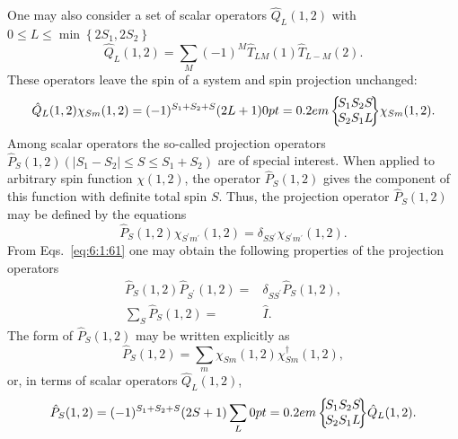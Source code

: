 One may also consider a set of scalar operators $\widehat{Q}_{L}(1,2)$ with $0 \leq L \leq \min \left\{2 S_{1}, 2 S_{2}\right\}$
\begin{equation}
\widehat{Q}_{L}(1,2)=\sum_{M}(-1)^{M} \widehat{T}_{L M}(1) \hat{T}_{L-M}(2). \label{eq:6:1:59}
\end{equation}
These operators leave the spin of a system and spin projection unchanged:
\begin{equation}
\hat{Q}_{L}(1,2) \chi_{S m}(1,2)=(-1)^{S_{1}+S_{2}+S}(2 L+1)\sixj{S_{1}}{S_{2}}{S}{S_{2}}{S_{1}}{L} \chi_{S m}(1,2). \label{eq:6:1:60}
\end{equation}
Among scalar operators the so-called projection operators $\widehat{P}_{S}(1,2)\left(\left|S_{1}-S_{2}\right| \leq S \leq S_{1}+S_{2}\right)$ are of special interest. When applied to arbitrary spin function $\chi(1,2)$, the operator $\widehat{P}_{S}(1,2)$ gives the component of this function with definite total spin $S$. Thus, the projection operator $\widehat{P}_{S}(1,2)$ may be defined by the equations
\begin{equation}
\widehat{P}_{S}(1,2) \chi_{S^{\prime} m^{\prime}}(1,2)=\delta_{S S^{\prime}} \chi_{S^{\prime} m^{\prime}}(1,2). \label{eq:6:1:61}
\end{equation}
From Eqs.~\eqref{eq:6:1:61} one may obtain the following properties of the projection operators
\begin{align}
\hat{P}_{S}(1,2) \hat{P}_{S^{\prime}}(1,2)=&\delta_{S S^{\prime}} \hat{P}_{S}(1,2), \label{eq:6:1:62}\\
\sum_{S} \hat{P}_{S}(1,2)=&\hat{I}. \label{eq:6:1:63}
\end{align}
The form of $\widehat{P}_{S}(1,2)$ may be written explicitly as
\begin{equation}
\widehat{P}_{S}(1,2)=\sum_{m} \chi_{S m}(1,2) \chi_{S m}^{\dagger}(1,2), \label{eq:6:1:64}
\end{equation}
or, in terms of scalar operators $\widehat{Q}_{L}(1,2)$,
\begin{equation}
\hat{P}_{S}(1,2)=(-1)^{S_{1}+S_{2}+S}(2 S+1) \sum_{L}\sixj{S_{1}}{S_{2}}{S}{S_{2}}{S_{1}}{L} \hat{Q}_{L}(1,2). \label{eq:6:1:65}
\end{equation}
